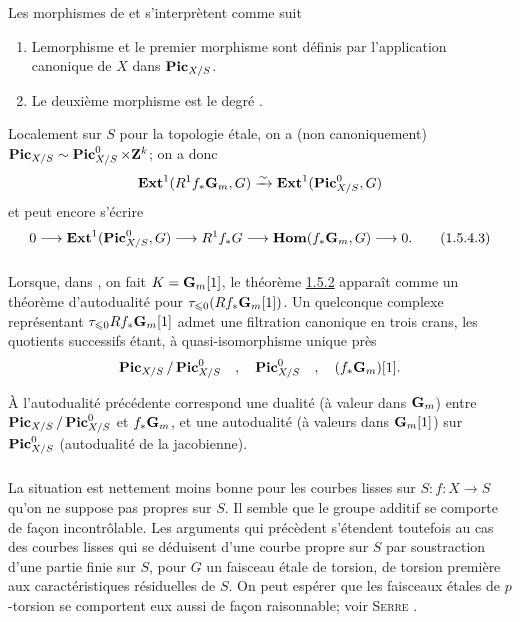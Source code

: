 \documentclass[10pt]{../fichiers-configuration-latex/smfart}
\begin{document}
Les morphismes de  et  s'interprètent
comme suit  
\begin{enumerate}
\renewcommand{\theenumi}{\alph{enumi}}
\renewcommand{\labelenumi}{\theenumi)}
\item Le\pageoriginale morphisme  et le premier
  morphisme  sont définis par l'application canonique
  de $X$ dans $\operatorname{\mathbf{Pic}}_{X/S}$.

\item Le deuxième morphisme  est le degré .
\end{enumerate}

Localement sur $S$ pour la topologie étale, on a (non canoniquement)
$\operatorname{\mathbf{Pic}}_{X/S}\sim \operatorname{\mathbf{Pic}}^{0}_{X/S}\times \mathbf{Z}^{k}$; on a donc
$$
\operatorname{\mathbf{Ext}}^{1}(R^{1}f_{\ast}\mathbf{G}_{m},G)\xrightarrow{\sim}\operatorname{\mathbf{Ext}}^{1}(\operatorname{\mathbf{Pic}}^{0}_{X/S}, G)
$$
et  peut encore s'écrire
\begin{equation*}
0 \longrightarrow \operatorname{\mathbf{Ext}}^{1}(\operatorname{\mathbf{Pic}}^{0}_{X/S},G)\longrightarrow
R^{1}f_{\ast}G\longrightarrow
\operatorname{\mathbf{Hom}}(f_{\ast}\mathbf{G}_{m},G)\longrightarrow 0{}.\tag{1.5.4.3}
\end{equation*}

\subsubsection{}
Lorsque, dans , on fait $K=\mathbf{G}_{m}[1]$, le théorème
\hyperref[XVIII.thm1.5.2]{1.5.2} apparaît comme un théorème d'autodualité pour $\tau_{\leqslant
0}(Rf_{\ast}\mathbf{G}_{m}[1])$. Un quelconque complexe représentant
$\tau_{\leqslant 0} Rf_{\ast} \mathbf{G}_{m}[1]$ admet une filtration
canonique en trois crans, les quotients successifs étant, à
quasi-isomorphisme unique près
$$
\operatorname{\mathbf{Pic}}_{X/S}/\operatorname{\mathbf{Pic}}^{0}_{X/S}\quad,\quad \operatorname{\mathbf{Pic}}^{0}_{X/S}\quad,\quad
(f_{\ast}\mathbf{G}_{m})[1]{}.
$$

À l'autodualité précédente correspond une dualité (à valeur dans
$\mathbf{G}_{m}$) entre $\operatorname{\mathbf{Pic}}_{X/S}/\operatorname{\mathbf{Pic}}^{0}_{X/S}$ et
$f_{\ast}\mathbf{G}_{m}$, et une autodualité (à valeurs dans
$\mathbf{G}_{m}[1]$) sur $\operatorname{\mathbf{Pic}}^{0}_{X/S}$ (autodualité de la
jacobienne).

\subsubsection{}
La situation est nettement moins bonne pour les courbes lisses sur
$S:f:X\rightarrow S$ qu'on ne suppose pas propres sur $S$. Il semble
que le groupe additif se comporte de façon incontrôlable. Les
arguments qui précèdent s'étendent toutefois au cas des courbes lisses
qui se déduisent d'une courbe propre sur $S$ par soustraction d'une
partie finie sur $S$, pour $G$ un faisceau étale de torsion, de
torsion première aux caractéristiques résiduelles de $S$. On peut
espérer que les faisceaux étales de $p$-torsion se comportent eux
aussi de façon raisonnable; voir \textsc{Serre}
\cite[Ch.~VI nᵒ 11 p.~126]{SGA4-18:6}.
\end{document}
